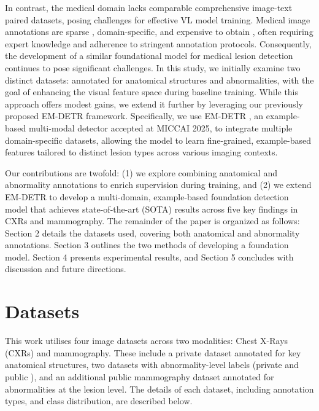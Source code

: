 \documentclass[runningheads]{llncs}
\begin{document}
In contrast, the medical domain lacks comparable comprehensive image-text paired datasets, posing challenges for effective VL model training. Medical image annotations are sparse \cite{nguyen2022vindr,NguyenMammo}, domain-specific, and expensive to obtain \cite{ghesu2022contrastive}, often requiring expert knowledge and adherence to stringent annotation protocols. Consequently, the development of a similar foundational model for medical lesion detection continues to pose significant challenges. In this study, we initially examine two distinct datasets: annotated for anatomical structures and abnormalities, with the goal of enhancing the visual feature space during baseline training. While this approach offers modest gains, we extend it further by leveraging our previously proposed EM-DETR \cite{emdetr} framework. Specifically, we use EM-DETR \cite{emdetr}, an example-based multi-modal detector accepted at MICCAI 2025, to integrate multiple domain-specific datasets, allowing the model to learn fine-grained, example-based features tailored to distinct lesion types across various imaging contexts. 

Our contributions are twofold: (1) we explore combining anatomical and abnormality annotations to enrich supervision during training, and (2) we extend EM-DETR to develop a multi-domain, example-based foundation detection model that achieves state-of-the-art (SOTA) results across five key findings in CXRs and mammography. The remainder of the paper is organized as follows: Section 2 details the datasets used, covering both anatomical and abnormality annotations. Section 3 outlines the two methods of developing a foundation model. Section 4 presents experimental results, and Section 5 concludes with discussion and future directions.


\section{Datasets}
\label{sec:datasets}

This work utilises four image datasets across two modalities: Chest X-Rays (CXRs) and mammography. These include a private dataset annotated for key anatomical structures, two datasets with abnormality-level labels (private \cite{ghesu2022contrastive} and public \cite{nguyen2022vindr}), and an additional public mammography dataset \cite{NguyenMammo} annotated for abnormalities at the lesion level. The details of each dataset, including annotation types, and class distribution, are described below.  
\end{document}
